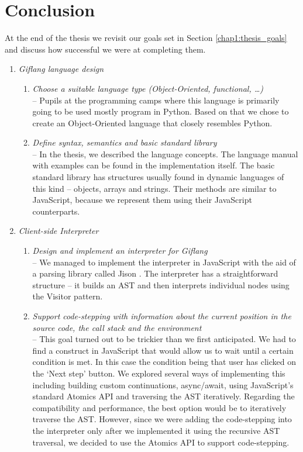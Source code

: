 \chapter*{Conclusion}
At the end of the thesis we revisit our goals set in Section \ref{chap1:thesis_goals} and discuss how successful we were at completing them.

\begin{enumerate}
\item \textit{Giflang language design} 
   \begin{enumerate}[label=(\alph*)]
     \item \textit{Choose a suitable language type (Object-Oriented, functional, \ldots)} \\
     -- Pupils at the programming camps where this language is primarily going to be used mostly program in Python. Based on that we chose to create an
     Object-Oriented language that closely resembles Python.
     \item \textit{Define syntax, semantics and basic standard library} \\
     -- In the thesis, we described the language concepts. The language manual with examples can be found in the implementation itself. The basic standard
     library has structures usually found in dynamic languages of this kind -- objects, arrays and strings. Their methods are similar to JavaScript,
     because we represent them using their JavaScript counterparts.
   \end{enumerate}
\item \textit{Client-side Interpreter}
   \begin{enumerate}[label=(\alph*)]
	 \item \textit{Design and implement an interpreter for Giflang} \\
     -- We managed to implement the interpreter in JavaScript with the aid of a parsing library called Jison \cite{Jison}. The interpreter
     has a straightforward structure -- it builds an AST and then interprets individual nodes using the Visitor pattern.
     \item \textit{Support code-stepping with information about the current position in the source code, the call stack and the environment} \\
     -- This goal turned out to be trickier than we first anticipated. We had to find a construct in JavaScript that would allow us to wait until a certain
     condition is met. In this case the condition being that user has clicked on the `Next step' button. We explored several ways of implementing this including
     building custom continuations, async/await, using JavaScript's standard Atomics API and traversing the AST iteratively. Regarding the compatibility and
     performance, the best option would be to iteratively traverse the AST. However, since we were adding the code-stepping into the interpreter only after we
     implemented it using the recursive AST traversal, we decided to use the Atomics API to support code-stepping.


\end{enumerate}
\end{enumerate}
